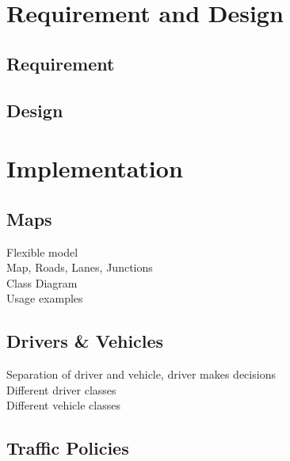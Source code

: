 \documentclass[11pt]{article}
\begin{document}
\section{Requirement and Design}
	\subsection{Requirement}
	\subsection{Design}
	
\newpage
\section{Implementation}

\subsection{Maps}

Flexible model
\\
Map, Roads, Lanes, Junctions
\\
Class Diagram
\\
Usage examples

\subsection{Drivers \& Vehicles}

Separation of driver and vehicle, driver makes decisions
\\
Different driver classes
\\
Different vehicle classes

\subsection{Traffic Policies}
\end{document}
